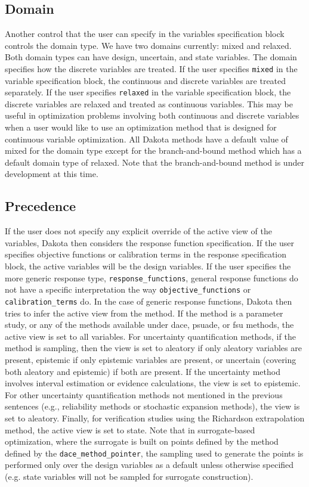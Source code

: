 \subsection{Domain}\label{variables:domain}
Another control that the user can specify in the variables specification 
block controls the domain type.  We have two domains currently:  
mixed and relaxed.  Both domain types can have design, uncertain, 
and state variables.  The domain specifies how the discrete variables 
are treated. If the user 
specifies \texttt{mixed} in the variable specification block, 
the continuous and discrete variables are treated separately. 
If the user specifies \texttt{relaxed} in the variable specification block, 
the discrete variables are relaxed and treated as continuous variables. 
This may be useful in optimization problems involving both 
continuous and discrete variables when a user would like 
to use an optimization method that is designed for continuous variable 
optimization.  All Dakota methods have a default value of mixed for the 
domain type except for the branch-and-bound method which has a default 
domain type of relaxed.  Note that the branch-and-bound method is 
under development at this time. 

\subsection{Precedence}\label{variables:precedence}
If the user does not specify any explicit override of the active view 
of the variables, Dakota then considers the response function 
specification.  If the user specifies objective functions or calibration 
terms in the response specification block, the active variables will 
be the design variables.  If the user specifies the more generic 
response type, \texttt{response\_functions}, general response 
functions do not have a specific interpretation the way 
\texttt{objective\_functions} or \texttt{calibration\_terms} do. 
In the case of generic response functions, Dakota then tries to 
infer the active view from the method.  If the method is a parameter 
study, or any of the methods available under dace, psuade, or fsu methods, 
the active view is set to all variables.  For uncertainty quantification 
methods, if the method is sampling, 
then the view is set to aleatory if only aleatory variables are present, 
epistemic if only epistemic variables are present, or uncertain (covering
both aleatory and epistemic) if both are present.  If the uncertainty method 
involves interval estimation or evidence calculations, the view is set 
to epistemic. For other uncertainty quantification methods not mentioned 
in the previous sentences (e.g., reliability methods or stochastic 
expansion methods), the view is set to aleatory. 
Finally, for verification studies using the Richardson extrapolation 
method, the active view is set to state.   
Note that in surrogate-based optimization, where the surrogate 
is built on points defined by the method defined by the 
\texttt{dace\_method\_pointer}, the sampling used to generate the points 
is performed only over the design variables as a default unless 
otherwise specified (e.g. state variables will not be sampled 
for surrogate construction). 

